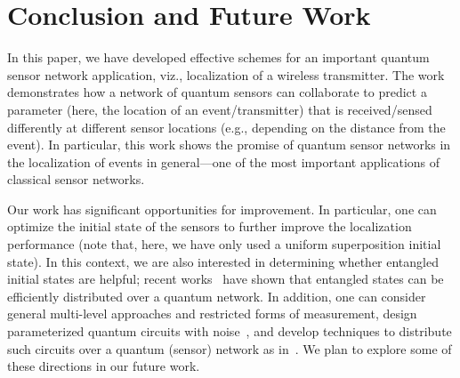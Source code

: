 \section{Conclusion and Future Work}
\label{sec:conclusion}

In this paper, we have developed effective schemes for an important quantum sensor
network application, viz., localization of a wireless transmitter. The work demonstrates
how a network of quantum sensors can collaborate to predict a parameter (here, the location of an
event/transmitter) that is received/sensed differently at different sensor locations (e.g., depending on the distance from the event).
In particular, this work shows the promise of quantum sensor networks in the localization of 
events in general---one of the most important applications of classical sensor networks.

Our work has significant opportunities for improvement. 
In particular, one can optimize the initial state of the sensors to further improve the localization performance (note that, here, we have only used a uniform superposition initial state).
In this context, we are also interested in determining whether
entangled initial states are helpful; recent 
works~\cite{swapping-tqe-22,predist-qce-22,ghz-qce-23} have shown that entangled states can be efficiently distributed over a quantum network. 
In addition, one can consider general multi-level approaches and restricted forms of measurement,
design parameterized quantum circuits with noise~\cite{quantumnas2022}, 
and develop techniques to distribute such circuits over a quantum (sensor) network as in~\cite{dqc-disc-q21, gdqc-qce-22, dqc-qsw-23}.
We plan to explore some of these directions in our future work.